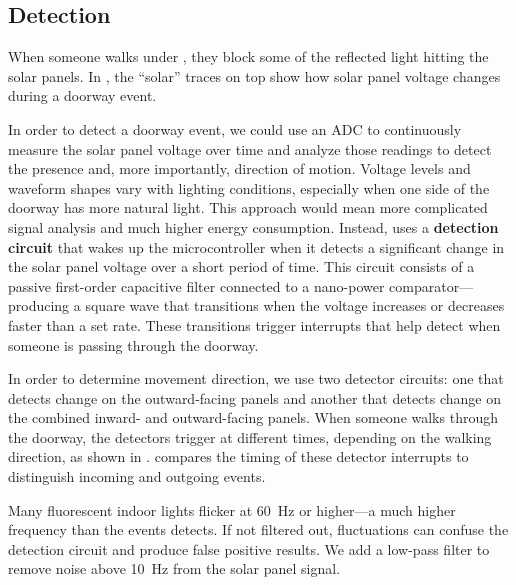 \subsection{Detection}
\label{sec:detection}




When someone walks under \sysname, they block some of the reflected light hitting the solar panels.
In , the ``solar'' traces on top show how solar panel voltage changes during a doorway event.

In order to detect a doorway event, we could use an ADC to continuously measure the solar panel voltage over time and analyze those readings to detect the presence and, more importantly, direction of motion.
Voltage levels and waveform shapes vary with lighting conditions, especially when one side of the doorway has more natural light.
This approach would mean more complicated signal analysis and much higher energy consumption.
Instead, \sysname uses a \textbf{detection circuit} that wakes up the microcontroller when it detects a significant change in the solar panel voltage over a short period of time.
This circuit consists of a passive first-order capacitive filter connected to a nano-power comparator---producing a square wave that transitions when the voltage increases or decreases faster than a set rate.
These transitions trigger interrupts that help \sysname detect when someone is passing through the doorway.

In order to determine movement direction, we use two detector circuits: one that detects change on the outward-facing panels and another that detects change on the combined inward- and outward-facing panels.
When someone walks through the doorway, the detectors trigger at different times, depending on the walking direction, as shown in .
\sysname compares the timing of these detector interrupts to distinguish incoming and outgoing events.


Many fluorescent indoor lights flicker at \SI{60}{\hertz} or higher---a much higher frequency than the events \sysname detects.
If not filtered out, fluctuations can confuse the detection circuit and produce false positive results.
We add a low-pass filter to remove noise above \SI{10}{\hertz} from the solar panel signal.

